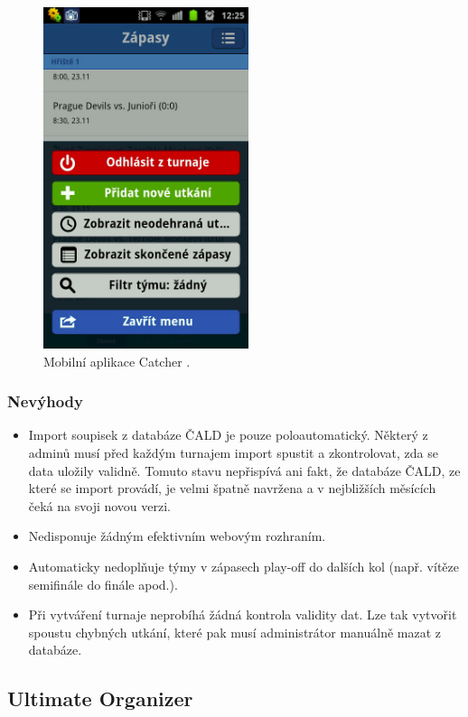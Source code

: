 \begin{figure}[ht!]
\centering
\includegraphics[width=60mm]{./images/catcher.png}
\caption{Mobilní aplikace Catcher \cite{catcher-play}.\label{overflow}}
\label{fig:uwsgi}
\end{figure}

\subsubsection*{Nevýhody}
\begin{itemize}
  \item Import soupisek z databáze ČALD je pouze poloautomatický. Některý z adminů musí před každým turnajem
    import spustit a zkontrolovat, zda se data uložily validně. Tomuto stavu nepřispívá ani fakt,
    že databáze ČALD, ze které se import provádí, je velmi špatně navržena a v nejbližších měsících čeká na svoji novou verzi.
  \item Nedisponuje žádným efektivním webovým rozhraním.
  \item Automaticky nedoplňuje týmy v zápasech play-off do dalších kol (např. vítěze semifinále do finále apod.).
  \item Při vytváření turnaje neprobíhá žádná kontrola validity dat.
    Lze tak vytvořit spoustu chybných utkání, které pak musí administrátor manuálně mazat z databáze. 
\end{itemize}

\subsection*{Ultimate Organizer}

